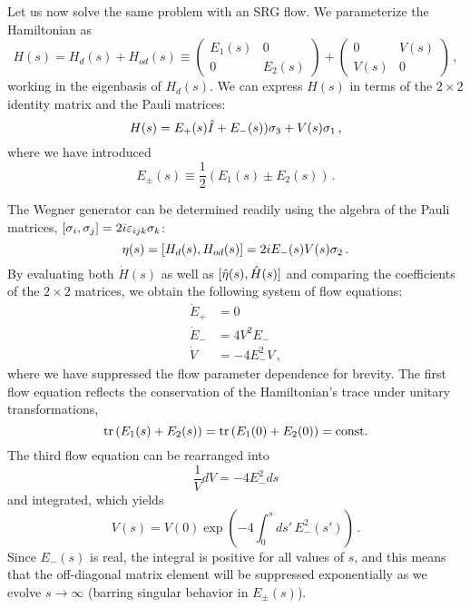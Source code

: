 Let us now solve the same problem with an SRG flow. We parameterize the Hamiltonian
as
\begin{equation}
  H(s) = H_d(s) + H_{od}(s) \equiv \begin{pmatrix}E_1(s) & 0 \\ 0 & E_2(s)\end{pmatrix} + 
         \begin{pmatrix} 0 & V(s) \\ V(s) & 0\end{pmatrix}\,,
\end{equation}
working in the eigenbasis of $H_d(s)$. We can express $H(s)$ in terms of the $2\times2$ 
identity matrix and the Pauli matrices:
\begin{equation}
  H(s) = E_{+}(s) \hat{I} + E_{-}(s))\sigma_3 
         + V(s)\sigma_1\,,
\end{equation}
where we have introduced
\begin{equation}
  E_{\pm}(s) \equiv \frac{1}{2}\left(E_1(s) \pm E_2(s)\right)\,.
\end{equation}

The Wegner generator can be determined readily using the algebra of
the Pauli matrices,
$[{\sigma_i},{\sigma_j}]=2i\varepsilon_{ijk}\sigma_k$:
\begin{equation}
  \eta(s) = [{H_d(s)},{H_{od}(s)}] = 2 i E_{-}(s) V(s) \sigma_2\,.
\end{equation}
By evaluating both $\dot{H}(s)$ as well as $[{\hat{\eta}(s)},{\hat{H}(s)}]$
and comparing the coefficients of the $2\times2$ matrices, we obtain the
following system of flow equations:
\begin{align}
  \dot{E}_+ & = 0 \label{eq:flow_Eplus}\\
  \dot{E}_{-} &= 4 V^2 E_{-} \label{eq:flow_Eminus}\\
  \dot{V}     &= -4 E_{-}^2V \label{eq:flow_V}\,,
\end{align}
where we have suppressed the flow parameter dependence for brevity.
The first flow equation reflects the conservation of the Hamiltonian's
trace under unitary transformations,
\begin{equation}
  \mathrm{tr}\, (E_1(s) + E_2(s)) = \mathrm{tr}\, (E_1(0) + E_2(0)) = \text{const.}
\end{equation} 
The third flow equation can be rearranged into
\begin{equation}
  \frac{1}{V}dV = - 4 E_{-}^2 ds
\end{equation}
and integrated, which yields
\begin{equation}
  V(s) = V(0)\exp\left(-4\int_0^sds'\,E^2_{-}(s') \right)\,.
\end{equation}
Since $E_{-}(s)$ is real, the integral is positive for all values
of $s$, and this means that the off-diagonal matrix element will 
be suppressed exponentially as we evolve $s\to\infty$ (barring
singular behavior in $E_{\pm}(s)$).

